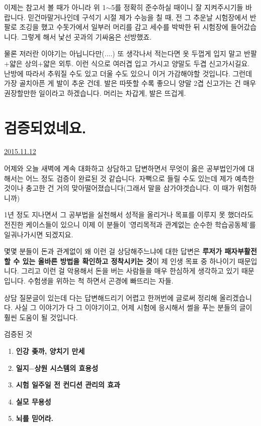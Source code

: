이제는 참고서 볼 때가 아니라 위 1$\sim$5를 정확히 준수하실 때이니 잘 지켜주시기들 바랍니다.
믿건마말거나인데 구석기 시절 제가 수능을 칠 때, 전 그 추운날 시험장에서 반팔로 조깅을 했고
수돗가에서 일부러 머리를 감고 세수를 박박한 뒤 시험장에 들어갔습니다. 그렇게 해서 낯선 곳과의 기싸움은 선방했죠.
\vspace{5mm}

물론 저러란 이야기는 아닙니다만(....) 또 생각나서 적는다면
옷 두껍게 입지 말고 반팔+얇은 상의+얇은 외투. 이런 식으로 여러겹 입고 가시고 양말도 두겹 신고가시길요.
난방에 따라서 추워질 수도 있고 더울 수도 있으니 이거 가감해야할 것입니다.
그런데 가장 골치아픈 게 발이 추운 건데. 발은 따뜻할 수록 좋으니 양말 2겹 신고가는 건 매우 권장할만한 일이라고 하겠습니다.
머리는 차갑게, 발은 뜨겁게.
\vspace{5mm}




\section{검증되었네요.}
\href{https://www.kockoc.com/Apoc/479357}{2015.11.12}

\vspace{5mm}

어제와 오늘 새벽에 계속 대화하고 상담하고 답변하면서
무엇이 옳은 공부법인가에 대해서는 어느 정도 검증이 완료된 것 같습니다.
자뻑으로 들릴 수도 있는데 제가 예측한 것이나 충고한 건 거의 맞아떨어졌습니다(그래서 말을 삼가야겟습니다. 이 때가 위험하니까)
\vspace{5mm}

1년 정도 지나면서 그 공부법을 실천해서 성적을 올리거나
목표를 이루지 못 했더라도 전진한 케이스들이 있으니 이제 이 분들이 '영리목적과 관계없는 순수한 학습공동체'를 일궈나가시면 되겠지요.
\vspace{5mm}

몇몇 분들이 돈과 관계없이 왜 이런 걸 상담해주느냐에 대한 답변은
\textbf{루저가 패자부활전 할 수 있는 올바른 방법을 확인하고 정착시키는 것}이 제 인생 목표 중 하나이기 때문입니다.
그리고 이런 걸 악용해서 돈을 버는 사람들을 매우 한심하게 생각하고 있기 때문입니다. 수험생을 위하는 척 하면서 곤경에 빠뜨리는 자들.
\vspace{5mm}

상담 질문글이 있는데 다는 답변해드리기 어렵고 한꺼번에 글로써 정리해 올리겠습니다.
사실 그 이야기가 다 그 이야기이고,
어제 시험에 응시해서 썰을 푸는 분들의 글이 훨씬 도움이 될 것입니다.
\vspace{5mm}

검증된 것
\vspace{5mm}
\begin{enumerate}
    \item \textbf{인강 좆까, 양치기 만세}
    \item \textbf{일지$-$상원 시스템의 효용성}
    \item \textbf{시험 일주일 전 컨디션 관리의 효과}
    \item \textbf{실모 무용성}
    \item \textbf{뇌를 믿어라.}
\end{enumerate}
\vspace{5mm}

